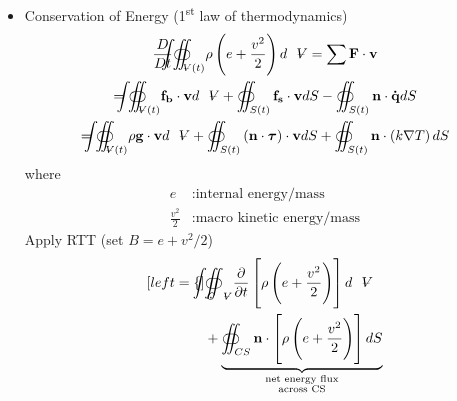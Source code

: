 \begin{itemize}
\begin{subequations}
\begin{align}
&\text{and apply continuity equation}\nonumber\\
\Longrightarrow &\underbrace{\rho\frac{\partial\mathbf{v}}{\partial t} + \rho \mathbf{v}\cdot\nabla\mathbf{v}}_{\displaystyle =\rho\frac{D\mathbf{v}}{Dt}} = \rho\mathbf{g} + \nabla\cdot\boldsymbol{\tau} \label{eq: 2-7b}
\end{align}
\end{subequations}
For an ideal fluid, $\mu = 0$,
\[
\boldsymbol{\tau} = -p\mathbf{I}\text{ only}
\]
hence \eqref{eq: 2-7b} reduce to
\begin{equation}
\boxed{\rho\frac{D\mathbf{v}}{Dt} = \rho \mathbf{g} - \nabla p}\text{ (Euler equation)}
\label{eq: 2-8}
\end{equation}
\item Conservation of Energy (1\textsuperscript{st} law of thermodynamics)
\begin{multline*}
\frac{D}{Dt}{\oiint \hspace{-23.5pt} \int}_{\volume (t)}\rho\left(e + \frac{v^2}{2}\right)d\volume = \sum\mathbf{F}\cdot\mathbf{v} \\
= {\oiint \hspace{-23.5pt} \int}_{\volume (t)}\mathbf{f_b}\cdot\mathbf{v}d\volume + \oiint_{S(t)}\mathbf{f_s}\cdot\mathbf{v}dS - \oiint_{S(t)}\mathbf{n}\cdot\mathbf{\dot{q}}dS \\
= {\oiint \hspace{-23.5pt} \int}_{\volume (t)}\rho\mathbf{g}\cdot\mathbf{v} d\volume + \oiint_{S(t)}\left(\mathbf{n}\cdot\boldsymbol{\tau}\right)\cdot\mathbf{v}dS + \oiint_{S(t)}\mathbf{n}\cdot\left(k\nabla T\right)dS
\end{multline*}
where 
\begin{align*}
e&\colon\text{internal energy/mass} \\
\frac{v^2}{2}&\colon\text{macro kinetic energy/mass}
\end{align*}
Apply RTT (set $B=e+v^2/2$)
\begin{subequations}
\begin{align}[left = \empheqlbrace\,]
&{\oiint \hspace{-23.5pt} \int}_{C\volume}\frac{\partial}{\partial t}\left[\rho\left(e+\frac{v^2}{2}\right)\right] d\volume \nonumber \\ 
&+ \underbrace{\oiint_{CS}\mathbf{n}\cdot\left[\rho\left(e+\frac{v^2}{2}\right)\right]dS}_
{
\begin{subarray}{c}
  \text{net energy flux}\\
  \text{across CS}
\end{subarray}
}
\end{align}
\end{subequations}
\end{itemize}
